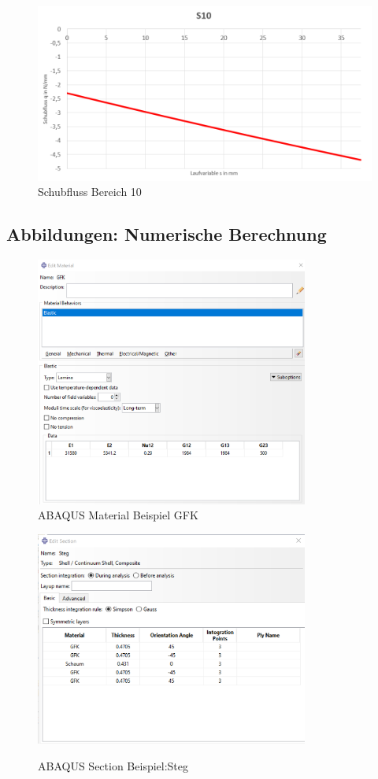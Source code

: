 \begin{figure}[h]
	\includegraphics[width=1.0\textwidth]{Bilder/S10.png}
	\caption{Schubfluss Bereich 10}
	\label{fig:S10}
\end{figure}
\FloatBarrier
\newpage
\subsection{Abbildungen: Numerische Berechnung}
\begin{figure}[h]
	\includegraphics[width=0.8\textwidth]{Bilder/Material_GFK}
	\caption{ABAQUS Material Beispiel GFK}
	\label{Material}
\end{figure}
\begin{figure}[h]
	\centering
	\includegraphics[width=0.8\textwidth]{Bilder/Steg_Material}
	\label{Steg_Material}
	\caption{ABAQUS Section Beispiel:Steg}
\end{figure}
\FloatBarrier
\:
\newpage
\newpage
